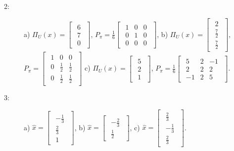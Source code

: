 \documentclass{article}
\begin{document}
\begin{description}
    \item [2:]
        a) $\Pi_{U}(x) = \begin{bmatrix}\begin{array}{r} 6 \\ 7 \\ 0 \end{array}\end{bmatrix}$, $P_{\pi} = \frac{1}{6} \begin{bmatrix}\begin{array}{rrr} 1 & 0 & 0\\ 0 & 1 & 0\\ 0 & 0 & 0 \end{array}\end{bmatrix}$,
        b) $\Pi_{U}(x) = \begin{bmatrix}\begin{array}{r} 2 \\ \frac{7}{2} \\ \frac{7}{2} \end{array}\end{bmatrix}$, $P_{\pi} = \begin{bmatrix}\begin{array}{rrr} 1 & 0 & 0\\ 0 & \frac{1}{2} & \frac{1}{2}\\ 0 & \frac{1}{2} & \frac{1}{2} \end{array}\end{bmatrix}$
        c) $\Pi_{U}(x) = \begin{bmatrix}\begin{array}{r} 5 \\ 2 \\ 1 \end{array}\end{bmatrix}$, $P_{\pi} = \frac{1}{6} \begin{bmatrix}\begin{array}{rrr} 5 & 2 & -1\\ 2 & 2 & 2\\ -1 & 2 & 5 \end{array}\end{bmatrix}$.

    \item [3:]
        a) $\hat{x} = \begin{bmatrix}\begin{array}{r} -\frac{1}{3} \\ \frac{2}{3} \\ 1 \end{array}\end{bmatrix}$,
        b) $\hat{x} = \begin{bmatrix}\begin{array}{r} -\frac{2}{3} \\ \frac{1}{2} \end{array}\end{bmatrix}$,
        c) $\hat{x} = \begin{bmatrix}\begin{array}{r} \frac{2}{3} \\ -\frac{1}{3}\\ \frac{2}{3} \end{array}\end{bmatrix}$.


\end{description}
\end{document}
